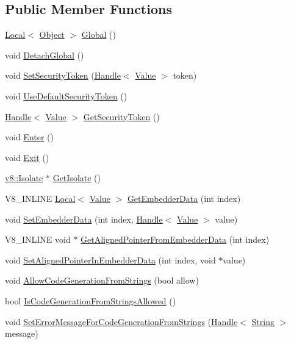 \subsection*{Public Member Functions}
\begin{DoxyCompactItemize}
\item 
\hyperlink{classv8_1_1_local}{Local}$<$ \hyperlink{classv8_1_1_object}{Object} $>$ \hyperlink{classv8_1_1_context_af5cd9f97ef6a3307c1c21f80f4b743eb}{Global} ()
\item 
void \hyperlink{classv8_1_1_context_a841c7dd92eb8c57df92a268a164dea97}{Detach\+Global} ()
\item 
void \hyperlink{classv8_1_1_context_a288d8549547f6bdf4312f5333f60f24d}{Set\+Security\+Token} (\hyperlink{classv8_1_1_local}{Handle}$<$ \hyperlink{classv8_1_1_value}{Value} $>$ token)
\item 
void \hyperlink{classv8_1_1_context_aa9e1a14982b64fd51ab87600a287bad2}{Use\+Default\+Security\+Token} ()
\item 
\hyperlink{classv8_1_1_local}{Handle}$<$ \hyperlink{classv8_1_1_value}{Value} $>$ \hyperlink{classv8_1_1_context_a8e71e658633518ca7718c0f6e938c6a9}{Get\+Security\+Token} ()
\item 
void \hyperlink{classv8_1_1_context_a6995c49d9897eb49053f07874b825133}{Enter} ()
\item 
void \hyperlink{classv8_1_1_context_a2db09d4fefb26023a40d88972a4c1599}{Exit} ()
\item 
\hyperlink{classv8_1_1_isolate}{v8\+::\+Isolate} $\ast$ \hyperlink{classv8_1_1_context_af55552d8658ecb20eff7af2c83e8ede2}{Get\+Isolate} ()
\item 
V8\+\_\+\+I\+N\+L\+I\+N\+E \hyperlink{classv8_1_1_local}{Local}$<$ \hyperlink{classv8_1_1_value}{Value} $>$ \hyperlink{classv8_1_1_context_a9cfafe0ac56f6aee17eb80a913489296}{Get\+Embedder\+Data} (int index)
\item 
void \hyperlink{classv8_1_1_context_ae18e007074770872e78e0040f36de8c6}{Set\+Embedder\+Data} (int index, \hyperlink{classv8_1_1_local}{Handle}$<$ \hyperlink{classv8_1_1_value}{Value} $>$ value)
\item 
V8\+\_\+\+I\+N\+L\+I\+N\+E void $\ast$ \hyperlink{classv8_1_1_context_aa3b5c1a1a5d145c6096840898013f559}{Get\+Aligned\+Pointer\+From\+Embedder\+Data} (int index)
\item 
void \hyperlink{classv8_1_1_context_a522063c88e4c2832f5ff4f3980815f58}{Set\+Aligned\+Pointer\+In\+Embedder\+Data} (int index, void $\ast$value)
\item 
void \hyperlink{classv8_1_1_context_a794ccc42113566f5d363f89c8b0d3c2c}{Allow\+Code\+Generation\+From\+Strings} (bool allow)
\item 
bool \hyperlink{classv8_1_1_context_aa7a960a232d232d1a2a904c2e6c18831}{Is\+Code\+Generation\+From\+Strings\+Allowed} ()
\item 
void \hyperlink{classv8_1_1_context_a6a8d067b246b8792b19e8075bc410f1d}{Set\+Error\+Message\+For\+Code\+Generation\+From\+Strings} (\hyperlink{classv8_1_1_local}{Handle}$<$ \hyperlink{classv8_1_1_string}{String} $>$ message)
\end{DoxyCompactItemize}
